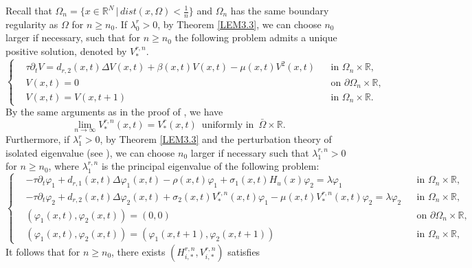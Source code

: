 \documentclass[11pt,reqno]{amsart}
\numberwithin{equation}{section}
\begin{document}
Recall that  $\Omega_{n} = \{ x\in\mathbb{R}^{N} \,|\, dist(x,\Omega) < \frac{1}{n} \} $ and $\Omega_{n}$ has the same boundary regularity as $\Omega$ for $n\geq n_{0}$.
If $\lambda_{0}^{r}>0$, by Theorem \ref{LEM3.3}, we can choose $n_{0}$ larger if necessary, such that for $n \geq n_{0}$ the following problem admits a unique positive solution, denoted by $V^{r,n}_{*}$.
\begin{equation*}
\left\{
\begin{aligned}
&\tau\partial_{t} V = d_{r,2}(x,t)\Delta V(x,t) + \beta(x,t)V(x,t) - \mu(x,t) V^{2}(x,t) && \text{in } \Omega_{n}\times\mathbb{R},\\
&V(x,t) = 0  &&\text{on } \partial\Omega_{n}\times\mathbb{R},\\
&V(x,t) = V(x,t+1) &&\text{in } \Omega_{n}\times\mathbb{R}.
\end{aligned}
\right.
\end{equation*}
By the same arguments as in the proof of \cite[Theorem C]{SX}, we have
\begin{equation*}
\lim_{n\to\infty} V^{r,n}_{*}(x,t) = V^{r}_{*}(x,t) \enspace \text{uniformly in}\enspace \bar{\Omega}\times\mathbb{R}.
\end{equation*}
Furthermore, if $\lambda_{1}^{r}>0$, by Theorem \ref{LEM3.3} and the perturbation theory of isolated eigenvalue (see \cite{Kato}), we can choose $n_{0}$ larger if necessary such that $\lambda_{1}^{r,n}>0$ for $n\geq n_{0}$, where $\lambda_{1}^{r,n}$ is the principal eigenvalue of the following problem:
\begin{equation*}
\left\{
\begin{aligned}
& -\tau \partial_{t} \varphi_{1} + d_{r,1}(x,t)\Delta \varphi_{1}(x,t)-\rho(x,t)\varphi_{1}+\sigma_{1}(x,t)H_{u}(x)\varphi_{2} = \lambda \varphi_{1} && \text{in } \Omega_{n}\times\mathbb{R},
\\
&- \tau \partial_{t} \varphi_{2} + d_{r,2}(x,t)\Delta \varphi_{2}(x,t)+\sigma_{2}(x,t)V_{*}^{r,n}(x,t)\varphi_{1}-\mu(x,t)V_{*}^{r,n}(x,t)\varphi_{2} = \lambda \varphi_{2} && \text{in } \Omega_{n}\times\mathbb{R},
\\
&( \varphi_{1}(x,t), \varphi_{2}(x,t)) = ( 0, 0) && \text{on } \partial\Omega_{n}\times\mathbb{R},
\\
&( \varphi_{1}(x,t), \varphi_{2}(x,t)) = ( \varphi_{1}(x,t+1), \varphi_{2}(x,t+1)) && \text{in } \Omega_{n}\times\mathbb{R},
\end{aligned}
\right.
\end{equation*}
It follows that for $n \geq n_{0}$, there exists $( H_{i,*}^{r,n}, V_{i,*}^{r,n})$ satisfies
\end{document}
